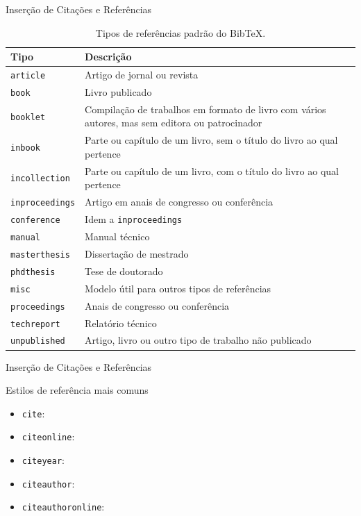 \documentclass[10pt]{beamer}
\begin{document}
\begin{frame}{Inserção de Citações e Referências}
    \begin{table}[H]
    \centering
    \caption{Tipos de referências padrão do Bib\TeX{}.}
    {\scriptsize
        \begin{tabular}{p{3cm}p{6cm}}
        \toprule
        \textbf{Tipo} & \textbf{Descrição} \\
        \midrule
        {\tt article}       & Artigo de jornal ou revista \\
        {\tt book}          & Livro publicado \\
        {\tt booklet}       & Compilação de trabalhos em formato de livro com vários autores, mas sem editora ou patrocinador \\
        {\tt inbook}        & Parte ou capítulo de um livro, sem o título do livro ao qual pertence \\
        {\tt incollection}  & Parte ou capítulo de um livro, com o título do livro ao qual pertence \\
        {\tt inproceedings} & Artigo em anais de congresso ou conferência \\
        {\tt conference}    & Idem a {\tt inproceedings} \\
        {\tt manual}        & Manual técnico \\
        {\tt masterthesis}  & Dissertação de mestrado \\
        {\tt phdthesis}     & Tese de doutorado \\
        {\tt misc}          & Modelo útil para outros tipos de referências \\
        {\tt proceedings}   & Anais de congresso ou conferência \\
        {\tt techreport}    & Relatório técnico \\
        {\tt unpublished}   & Artigo, livro ou outro tipo de trabalho não publicado \\
        \bottomrule
        \end{tabular}
    }
    \end{table}
\end{frame}

\begin{frame}{Inserção de Citações e Referências}
    \begin{block}{Estilos de referência mais comuns}
        \begin{itemize}[label=\textbullet]
            \item {\tt cite}:
            \item {\tt citeonline}:
            \item {\tt citeyear}:
            \item {\tt citeauthor}:
            \item {\tt citeauthoronline}:
        \end{itemize}
    \end{block}
\end{frame}
\end{document}
